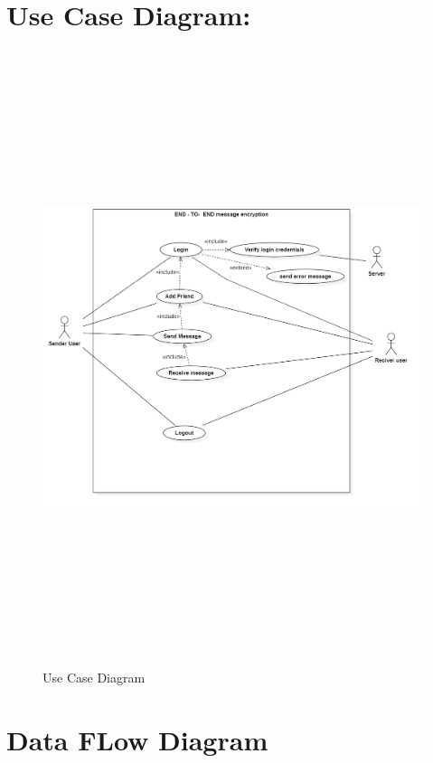 \pagebreak
\section{Use Case Diagram:}
\begin{figure}[H]
	\centering
	\includegraphics[width=180mm, height=180mm]{images/UseCaseDiagram1.png}
	\caption{Use Case Diagram} %
	\label{figusecase} %
\end{figure}

\pagebreak
\section{Data FLow Diagram}
